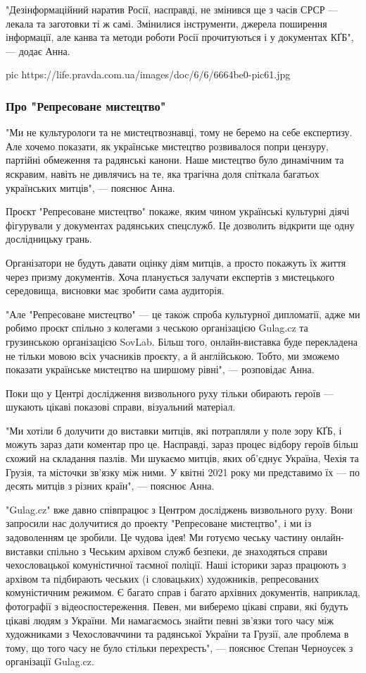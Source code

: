 "Дезінформаційний наратив Росії, насправді, не змінився ще з часів СРСР —
лекала та заготовки ті ж самі. Змінилися інструменти, джерела поширення
інформації, але канва та методи роботи Росії прочитуються і у документах КҐБ",
— додає Анна.

\ifcmt
pic https://life.pravda.com.ua/images/doc/6/6/6664be0-pic61.jpg
\fi

\subsubsection{Про "Репресоване мистецтво"}

"Ми не культурологи та не мистецтвознавці, тому не беремо на себе експертизу.
Але хочемо показати, як українське мистецтво розвивалося попри цензуру,
партійні обмеження та радянські канони. Наше мистецтво було динамічним та
яскравим, навіть не дивлячись на те, яка трагічна доля спіткала багатьох
українських митців", — пояснює Анна.

Проєкт "Репресоване мистецтво" покаже, яким чином українські культурні діячі
фігурували у документах радянських спецслужб. Це дозволить відкрити ще одну
дослідницьку грань.

Організатори не будуть давати оцінку діям митців, а просто покажуть їх життя
через призму документів. Хоча планується залучати експертів з мистецького
середовища, висновки має зробити сама аудиторія.

"Але "Репресоване мистецтво" — це також спроба культурної дипломатії, адже ми
робимо проєкт спільно з колегами з чеською організацією Gulag.cz та грузинською
організацією SovLab. Більш того, онлайн-виставка буде перекладена не тільки
мовою всіх учасників проєкту, а й англійською. Тобто, ми зможемо показати
українське мистецтво на ширшому рівні", — розповідає Анна.

Поки що у Центрі дослідження визвольного руху тільки обирають героїв — шукають
цікаві показові справи, візуальний матеріал. 

"Ми хотіли б долучити до виставки митців, які потрапляли у поле зору КҐБ, і
можуть зараз дати коментар про це. Насправді, зараз процес відбору героїв більш
схожий на складання пазлів. Ми шукаємо митців, яких об'єднує Україна, Чехія та
Грузія, та місточки зв'язку між ними. У квітні 2021 року ми представимо їх — по
десять митців з різних країн", — пояснює Анна.

"Gulag.cz" вже давно співпрацює з Центром досліджень визвольного руху. Вони
запросили нас долучитися до проекту "Репресоване мистецтво", і ми із
задоволенням це зробили. Це чудова ідея! Ми готуємо чеську частину
онлайн-виставки спільно з Чеським архівом служб безпеки, де знаходяться справи
чехословацької комуністичної таємної поліції. Наші історики зараз працюють з
архівом та підбирають чеських (і словацьких) художників, репресованих
комуністичним режимом. Є багато справ і багато архівних документів, наприклад,
фотографії з відеоспостереження. Певен, ми виберемо цікаві справи, які будуть
цікаві людям з України. Ми намагаємось знайти певні зв’язки того часу між
художниками з Чехословаччини та радянської України та Грузії, але проблема в
тому, що того часу не було стільки перехресть", — пояснює Степан Черноусек з
організації Gulag.cz.

